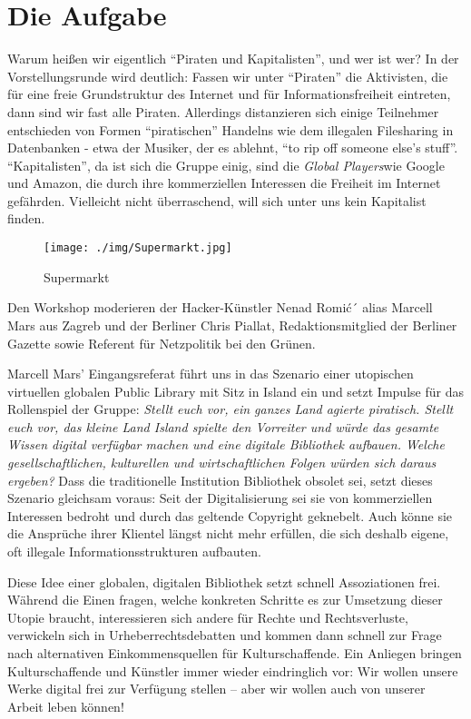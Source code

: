 \documentclass[a4paper,
fontsize=11pt,
oneside,
numbers=noperiodatend,
parskip=half-,
bibliography=totoc,
final
]{scrartcl}
\begin{document}
\section*{Die Aufgabe}\label{die-aufgabe}

Warum heißen wir eigentlich \enquote{Piraten und Kapitalisten}, und wer
ist wer? In der Vorstellungsrunde wird deutlich: Fassen wir unter
\enquote{Piraten} die Aktivisten, die für eine freie Grundstruktur des
Internet und für Informationsfreiheit eintreten, dann sind wir fast alle
Piraten. Allerdings distanzieren sich einige Teilnehmer entschieden von
Formen \enquote{piratischen} Handelns wie dem illegalen Filesharing in
Datenbanken - etwa der Musiker, der es ablehnt, \enquote{to rip off
someone else's stuff}. \enquote{Kapitalisten}, da ist sich die Gruppe
einig, sind die \emph{Global Players}wie Google und Amazon, die durch
ihre kommerziellen Interessen die Freiheit im Internet gefährden.
Vielleicht nicht überraschend, will sich unter uns kein Kapitalist
finden.

\begin{figure}[htbp]
\centering
\texttt{[image: ./img/Supermarkt.jpg]}
\caption{Supermarkt}
\end{figure}

Den Workshop moderieren der Hacker-Künstler Nenad Romić´ alias Marcell
Mars aus Zagreb und der Berliner Chris Piallat, Redaktionsmitglied der
Berliner Gazette sowie Referent für Netzpolitik bei den Grünen.

Marcell Mars' Eingangsreferat führt uns in das Szenario einer utopischen
virtuellen globalen Public Library mit Sitz in Island ein und setzt
Impulse für das Rollenspiel der Gruppe: \emph{Stellt euch vor, ein
ganzes Land agierte piratisch. Stellt euch vor, das kleine Land Island
spielte den Vorreiter und würde das gesamte Wissen digital verfügbar
machen und eine digitale Bibliothek aufbauen. Welche gesellschaftlichen,
kulturellen und wirtschaftlichen Folgen würden sich daraus ergeben?}
Dass die traditionelle Institution Bibliothek obsolet sei, setzt dieses
Szenario gleichsam voraus: Seit der Digitalisierung sei sie von
kommerziellen Interessen bedroht und durch das geltende Copyright
geknebelt. Auch könne sie die Ansprüche ihrer Klientel längst nicht mehr
erfüllen, die sich deshalb eigene, oft illegale Informationsstrukturen
aufbauten.~

Diese Idee einer globalen, digitalen Bibliothek setzt schnell
Assoziationen frei. Während die Einen fragen, welche konkreten Schritte
es zur Umsetzung dieser Utopie braucht, interessieren sich andere für
Rechte und Rechtsverluste, verwickeln sich in Urheberrechtsdebatten und
kommen dann schnell zur Frage nach alternativen Einkommensquellen für
Kulturschaffende. Ein Anliegen bringen Kulturschaffende und Künstler
immer wieder eindringlich vor: Wir wollen unsere Werke digital frei zur
Verfügung stellen -- aber wir wollen auch von unserer Arbeit leben
können!~
\end{document}
